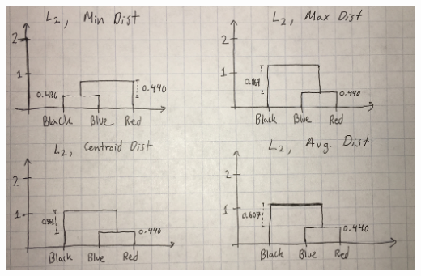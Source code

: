 \documentclass[submit]{harvardml}
\begin{document}
\begin{enumerate}
\begin{center}
\includegraphics[scale=0.15]{den}
\end{center}

\end{enumerate}

\newpage 
\end{document}
